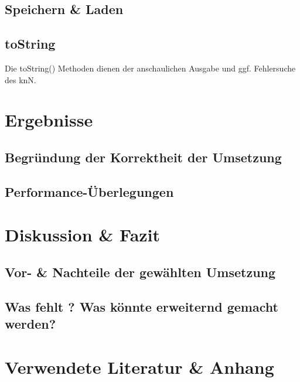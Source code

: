 \documentclass[paper=A4,pagesize=auto,12pt,headinclude=true,footinclude=true,BCOR=0mm,DIV=calc]{scrartcl}
\begin{document}
\subsection{Speichern \& Laden}

\subsection{toString}
Die toString() Methoden dienen der anschaulichen Ausgabe und ggf. Fehlersuche des knN. 

\newpage

\section{Ergebnisse}

\subsection{Begründung der Korrektheit der Umsetzung}

\subsection{Performance-Überlegungen}

\newpage

\section{Diskussion \& Fazit}

\subsection{Vor- \& Nachteile der gewählten Umsetzung}

\subsection{Was fehlt ? Was könnte erweiternd gemacht werden?}

\newpage

\section{Verwendete Literatur \& Anhang}
\end{document}
